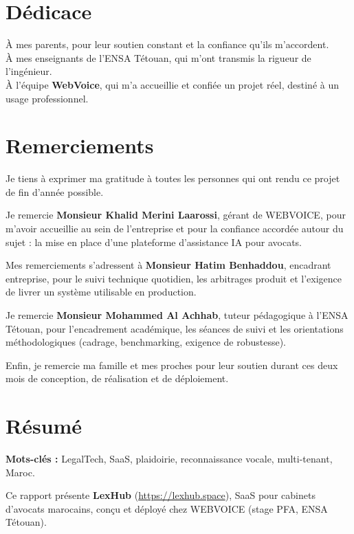\chapter*{Dédicace}

À mes parents, pour leur soutien constant et la confiance qu'ils m'accordent.\\[0.4em]
À mes enseignants de l'ENSA Tétouan, qui m'ont transmis la rigueur de l'ingénieur.\\[0.4em]
À l'équipe \textbf{WebVoice}, qui m'a accueillie et confiée un projet réel, destiné à un usage professionnel.

\chapter*{Remerciements}

Je tiens à exprimer ma gratitude à toutes les personnes qui ont rendu ce projet de fin d'année possible.

Je remercie \textbf{Monsieur Khalid Merini Laarossi}, gérant de WEBVOICE, pour m'avoir accueillie au sein de l'entreprise et pour la confiance accordée autour du sujet : la mise en place d'une plateforme d'assistance IA pour avocats.

Mes remerciements s'adressent à \textbf{Monsieur Hatim Benhaddou}, encadrant entreprise, pour le suivi technique quotidien, les arbitrages produit et l'exigence de livrer un système utilisable en production.

Je remercie \textbf{Monsieur Mohammed Al Achhab}, tuteur pédagogique à l'ENSA Tétouan, pour l'encadrement académique, les séances de suivi et les orientations méthodologiques (cadrage, benchmarking, exigence de robustesse).

Enfin, je remercie ma famille et mes proches pour leur soutien durant ces deux mois de conception, de réalisation et de déploiement.

\chapter*{Résumé}

\textbf{Mots-clés :} LegalTech, SaaS, plaidoirie, reconnaissance vocale, multi-tenant, Maroc.

Ce rapport présente \textbf{LexHub} (\url{https://lexhub.space}), SaaS pour cabinets d'avocats marocains, conçu et déployé chez WEBVOICE (stage PFA, ENSA Tétouan).

